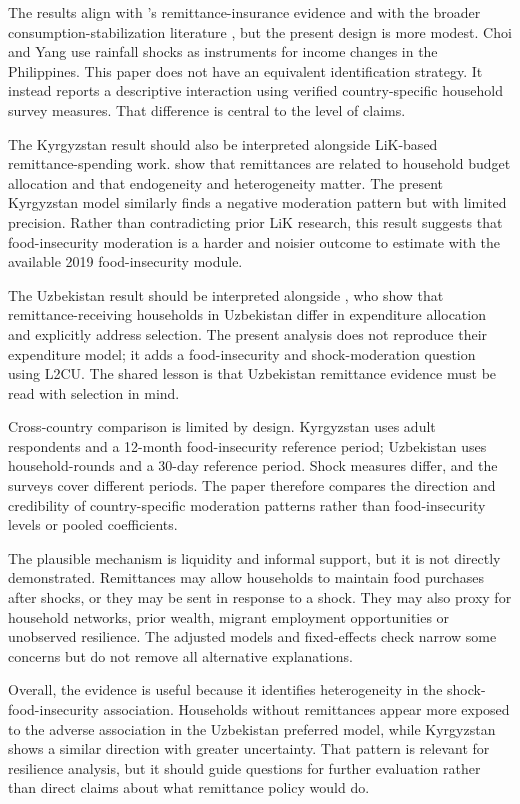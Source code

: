 \documentclass[11pt]{article}
\begin{document}
The results align with \textcite{ChoiYang2007}'s remittance-insurance evidence and with the broader consumption-stabilization literature \parencite{CombesEbeke2011}, but the present design is more modest. Choi and Yang use rainfall shocks as instruments for income changes in the Philippines. This paper does not have an equivalent identification strategy. It instead reports a descriptive interaction using verified country-specific household survey measures. That difference is central to the level of claims.

The Kyrgyzstan result should also be interpreted alongside LiK-based remittance-spending work. \textcite{Wang2021} show that remittances are related to household budget allocation and that endogeneity and heterogeneity matter. The present Kyrgyzstan model similarly finds a negative moderation pattern but with limited precision. Rather than contradicting prior LiK research, this result suggests that food-insecurity moderation is a harder and noisier outcome to estimate with the available 2019 food-insecurity module.

The Uzbekistan result should be interpreted alongside \textcite{Kakhkharov2021}, who show that remittance-receiving households in Uzbekistan differ in expenditure allocation and explicitly address selection. The present analysis does not reproduce their expenditure model; it adds a food-insecurity and shock-moderation question using L2CU. The shared lesson is that Uzbekistan remittance evidence must be read with selection in mind.

Cross-country comparison is limited by design. Kyrgyzstan uses adult respondents and a 12-month food-insecurity reference period; Uzbekistan uses household-rounds and a 30-day reference period. Shock measures differ, and the surveys cover different periods. The paper therefore compares the direction and credibility of country-specific moderation patterns rather than food-insecurity levels or pooled coefficients.

The plausible mechanism is liquidity and informal support, but it is not directly demonstrated. Remittances may allow households to maintain food purchases after shocks, or they may be sent in response to a shock. They may also proxy for household networks, prior wealth, migrant employment opportunities or unobserved resilience. The adjusted models and fixed-effects check narrow some concerns but do not remove all alternative explanations.

Overall, the evidence is useful because it identifies heterogeneity in the shock-food-insecurity association. Households without remittances appear more exposed to the adverse association in the Uzbekistan preferred model, while Kyrgyzstan shows a similar direction with greater uncertainty. That pattern is relevant for resilience analysis, but it should guide questions for further evaluation rather than direct claims about what remittance policy would do.
\end{document}
